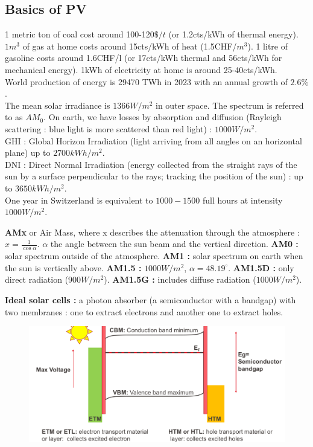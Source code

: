 \documentclass[../main.tex]{subfiles}
\begin{document}
\localtableofcontents

\subsection{Basics of PV}

1 metric ton of coal cost around 100-120$\$/t$ (or 1.2cts/kWh of thermal energy). $1m^3$ of gas at home costs around 15cts/kWh of heat (1.5CHF/$m^3$). 1 litre of gasoline costs around 1.6CHF/l (or 17cts/kWh thermal and 56cts/kWh for mechanical energy). 1kWh of electricity at home is around 25-40cts/kWh.\\

World production of energy is 29470 TWh in 2023 with an annual growth of $2.6\%$. \\

 The mean solar irradiance is $1366 W/m^2$ in outer space. The spectrum is referred to as $AM_0$. On earth, we have losses by absorption and diffusion (Rayleigh scattering : blue light is more scattered than red light) : $1000W/m^2$.\\
 GHI : Global Horizon Irradiation (light arriving from all angles on an horizontal plane) up to $2700 kWh/m^2$.\\
 DNI : Direct Normal Irradiation (energy collected from the straight rays of the sun by a surface perpendicular to the rays; tracking the position of the sun) : up to $3650 kWh/m^2$.\\

 One year in Switzerland is equivalent to $1000-1500$ full hours at intensity $1000W/m^2$.\\

 \begin{theorem}
     \textbf{AMx} or Air Mass, where x describes the attenuation through the atmosphere : $x = \frac{1}{\cos \alpha}$. $\alpha$ the angle between the sun beam and the vertical direction. \textbf{AM0 :} solar spectrum outside of the atmosphere. \textbf{AM1 :} solar spectrum on earth when the sun is vertically above. \textbf{AM1.5 :} $1000W/m^2$, $\alpha = 48.19^\circ$. \textbf{AM1.5D :} only direct radiation ($900W/m^2$). \textbf{AM1.5G :} includes diffuse radiation ($1000W/m^2$).
 \end{theorem}

 \textbf{Ideal solar cells :} a photon absorber (a semiconductor with a bandgap) with two membranes : one to extract electrons and another one to extract holes. 

 \begin{figure}[hbt!]
     \centering
     \includegraphics[width=0.7\linewidth]{IMAGES/PV/Screenshot 2025-02-18 at 14.25.18.jpeg.png}
 \end{figure}
\end{document}
